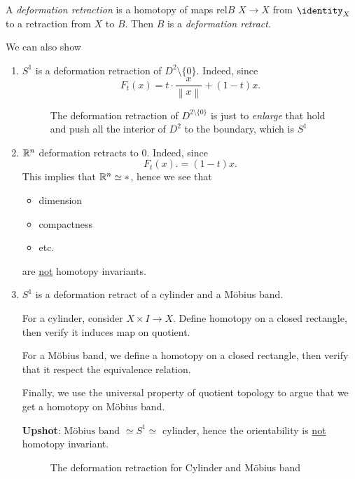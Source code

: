 \begin{prev}
	A \emph{deformation retraction} is a homotopy of maps \(\mathrm{rel} B\) \(X\to X\) from
	\(\identity_X\) to a retraction from \(X\) to \(B\). Then \(B\) is a \emph{deformation retract}.
\end{prev}
\begin{eg}
	We can also show
	\begin{enumerate}
		\item \(S^1\) is a deformation retraction of \(D^{2}\setminus \{0\}\). Indeed, since
		      \[
			      F_t(x) = t\cdot \frac{x}{\left\lVert x\right\rVert } + (1 - t)x.
		      \]
		      \begin{figure}[H]
			      \centering
			      \caption{The deformation retraction of \(D^{2\setminus \{0\}}\) is just to \emph{enlarge} that hold and push all the interior of \(D^2\) to the boundary, which is \(S^1\)}
			      \label{fig:eg:punched-circle}
		      \end{figure}
		\item \(\mathbb{\MakeUppercase{R}} ^n\) deformation retracts to \(0\). Indeed, since
		      \[
			      F_t(x). = (1 - t)x.
		      \]
		      This implies that \(\mathbb{\MakeUppercase{R}} ^n\simeq *\), hence we see that
		      \begin{itemize}
			      \item dimension
			      \item compactness
			      \item etc.
		      \end{itemize}
		      are \underline{not} homotopy invariants.
		\item \(S^1\) is a deformation retract of a cylinder and a Möbius band.
		      \par For a cylinder, consider \(X\times I \to X\). Define homotopy on a closed rectangle, then
		      verify it induces map on quotient.
		      \par For a Möbius band, we define a homotopy on a closed rectangle, then verify
		      that it respect the equivalence relation.

		      \par Finally, we use the universal property of quotient topology to argue that we get a homotopy on
		      Möbius band.

		      \textbf{Upshot}: \(\text{Möbius band } \simeq S^1 \simeq \text{ cylinder} \), hence the orientability
		      is \underline{not} homotopy invariant.
		      \begin{figure}[H]
			      \centering
			      \caption{The deformation retraction for Cylinder and Möbius band}
			      \label{fig:eg:cylinder-mobiusband}
		      \end{figure}
	\end{enumerate}
\end{eg}